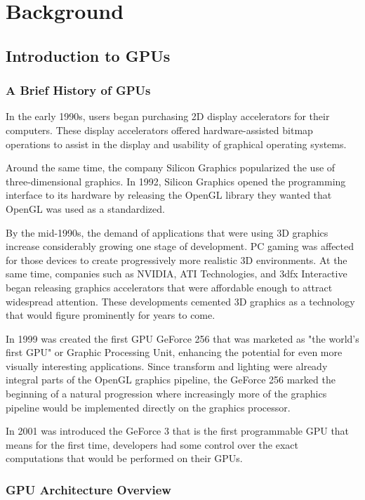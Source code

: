 \documentclass[Ingles]{ic-tese-v1}
\begin{document}
\chapter{Background}
\label{cap:background}

\section{Introduction to GPUs}
\subsection{A Brief History of GPUs}
In the early 1990s, users began purchasing
2D display accelerators for their computers. These display accelerators
offered hardware-assisted bitmap operations to assist in the display and usability
of graphical operating systems.

Around the same time, the company Silicon Graphics popularized the use
of three-dimensional graphics. In 1992, Silicon Graphics opened the
programming interface to its hardware by releasing the OpenGL library they wanted
that OpenGL was used as a standardized.

By the mid-1990s, the demand of applications that were using 3D graphics 
increase considerably growing one stage of development. PC gaming was affected
for those devices to create progressively more realistic 3D environments.
At the same time, companies such as NVIDIA, ATI Technologies,
and 3dfx Interactive began releasing graphics accelerators that were affordable 
enough to attract widespread attention. These developments cemented 3D
graphics as a technology that would figure prominently for years to come.

In 1999 was created the first GPU GeForce 256 that was marketed as "the world's
first GPU" or Graphic Processing Unit, enhancing the potential
for even more visually interesting applications. Since transform and lighting were
already integral parts of the OpenGL graphics pipeline, the GeForce 256 marked
the beginning of a natural progression where increasingly more of the graphics
pipeline would be implemented directly on the graphics processor.

In 2001 was introduced the GeForce 3 that is the first programmable GPU that means
for the first time, developers had some control over the exact computations
that would be performed on their GPUs.

\subsection{GPU Architecture Overview}
\end{document}
